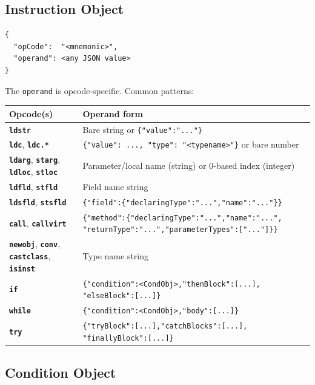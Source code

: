 \documentclass[11pt,a4paper]{article}
\newcommand{\code}[1]{\texttt{\small #1}}
\newcommand{\opcode}[1]{\textbf{\texttt{#1}}}
\begin{document}
\subsection{Instruction Object}

\begin{lstlisting}[style=json]
{
  "opCode":  "<mnemonic>",
  "operand": <any JSON value>
}
\end{lstlisting}

The \texttt{operand} is opcode-specific. Common patterns:

\begin{longtable}{lp{8cm}}
  \toprule
  \textbf{Opcode(s)} & \textbf{Operand form} \\
  \midrule
  \endhead
  \opcode{ldstr}                          & Bare string or \code{\{"value":"..."\}} \\
  \opcode{ldc}, \opcode{ldc.*}            & \code{\{"value": ..., "type": "<typename>"\}} or bare number \\
  \opcode{ldarg}, \opcode{starg},
  \opcode{ldloc}, \opcode{stloc}          & Parameter/local name (string) or 0-based index (integer) \\
  \opcode{ldfld}, \opcode{stfld}          & Field name string \\
  \opcode{ldsfld}, \opcode{stsfld}        & \code{\{"field":\{"declaringType":"...","name":"..."\}\}} \\
  \opcode{call}, \opcode{callvirt}        &
    \code{\{"method":\{"declaringType":"...","name":"...",}
    \code{"returnType":"...","parameterTypes":["..."]\}\}} \\
  \opcode{newobj}, \opcode{conv},
  \opcode{castclass}, \opcode{isinst}     & Type name string \\
  \opcode{if}                             &
    \code{\{"condition":<CondObj>,"thenBlock":[...],}
    \code{"elseBlock":[...]\}} \\
  \opcode{while}                          & \code{\{"condition":<CondObj>,"body":[...]\}} \\
  \opcode{try}                            &
    \code{\{"tryBlock":[...],"catchBlocks":[...],}
    \code{"finallyBlock":[...]\}} \\
  \bottomrule
\end{longtable}

\subsection{Condition Object}
\end{document}
